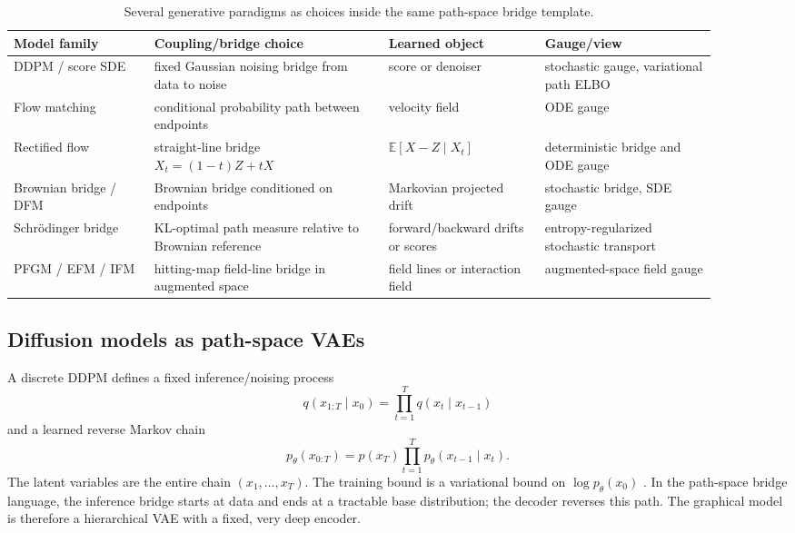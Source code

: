 \documentclass[twoside,11pt]{jmlr}
\numberwithin{equation}{section}
\newcommand{\E}{\mathbb{E}}
\begin{document}
\begin{table}[t]
\centering
\small
\begin{tabular}{@{}p{0.18\linewidth}p{0.30\linewidth}p{0.20\linewidth}p{0.22\linewidth}@{}}
\toprule
Model family & Coupling/bridge choice & Learned object & Gauge/view \\
\midrule
DDPM / score SDE & fixed Gaussian noising bridge from data to noise & score or denoiser & stochastic gauge, variational path ELBO \\
Flow matching & conditional probability path between endpoints & velocity field & ODE gauge \\
Rectified flow & straight-line bridge $X_t=(1-t)Z+tX$ & $\E[X-Z\mid X_t]$ & deterministic bridge and ODE gauge \\
Brownian bridge / DFM & Brownian bridge conditioned on endpoints & Markovian projected drift & stochastic bridge, SDE gauge \\
Schr\"odinger bridge & KL-optimal path measure relative to Brownian reference & forward/backward drifts or scores & entropy-regularized stochastic transport \\
PFGM / EFM / IFM & hitting-map field-line bridge in augmented space & field lines or interaction field & augmented-space field gauge \\
\bottomrule
\end{tabular}
\caption{Several generative paradigms as choices inside the same path-space bridge template.}
\label{tab:instances}
\end{table}

\subsection{Diffusion models as path-space VAEs}

A discrete DDPM defines a fixed inference/noising process
\begin{equation}
    q(x_{1:T}\mid x_0)=\prod_{t=1}^T q(x_t\mid x_{t-1})
\end{equation}
and a learned reverse Markov chain
\begin{equation}
    p_\theta(x_{0:T})=p(x_T)\prod_{t=1}^T p_\theta(x_{t-1}\mid x_t).
\end{equation}
The latent variables are the entire chain $(x_1,\ldots,x_T)$. The training bound is a variational bound on $\log p_\theta(x_0)$ \citep{ho2020ddpm,kingma2021vdm}. In the path-space bridge language, the inference bridge starts at data and ends at a tractable base distribution; the decoder reverses this path. The graphical model is therefore a hierarchical VAE with a fixed, very deep encoder.
\end{document}
